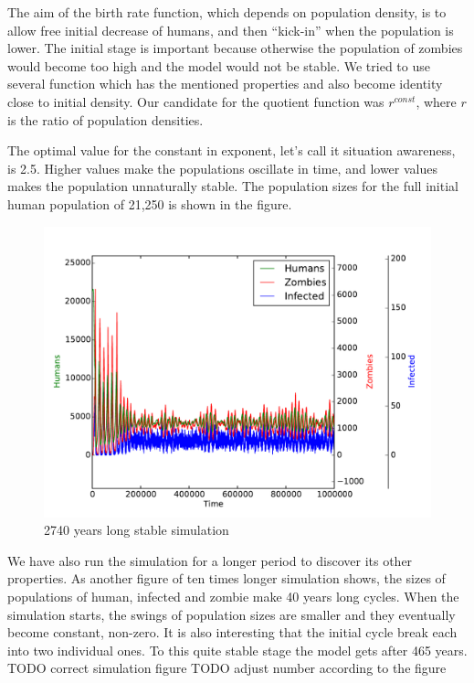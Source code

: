 \documentclass[a4paper]{article}
\begin{document}
The aim of the birth rate function, which depends on population density, is to allow free initial decrease of humans, and then ``kick-in'' when the population is lower.
The initial stage is important because otherwise the population of zombies would become too high and the model would not be stable.
We tried to use several function which has the mentioned properties and also become identity close to initial density.
Our candidate for the quotient function was $r^{const}$, where $r$ is the ratio of population densities.

The optimal value for the constant in exponent, let's call it situation awareness, is 2.5.
Higher values make the populations oscillate in time, and lower values makes the population unnaturally stable.
The population sizes for the full initial human population of 21,250 is shown in the figure.

\begin{figure}[pht]
    \centering
    \includegraphics[width=\textwidth]{stable_1000000}
    \caption{2740 years long stable simulation}
\end{figure}

We have also run the simulation for a longer period to discover its other properties.
As another figure of ten times longer simulation shows, the sizes of populations of human, infected and zombie make 40 years long cycles.
When the simulation starts, the swings of population sizes are smaller and they eventually become constant, non-zero.
It is also interesting that the initial cycle break each into two individual ones.
To this quite stable stage the model gets after 465 years.
TODO correct simulation figure
TODO adjust number according to the figure
\end{document}
